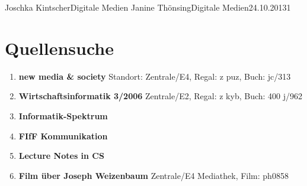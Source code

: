 \documentclass{lib/wa}
\begin{document}
  {Joschka Kintscher}{Digitale Medien}
  {Janine Thönsing}{Digitale Medien}{24.10.2013}{1}


\section{Quellensuche}

  \begin{enumerate}
    \item\textbf{new media \& society}
    \newline
    Standort: Zentrale/E4, Regal: z puz, Buch: jc/313
    \newline
    \cite{vergeer2013}

    \item\textbf{Wirtschaftsinformatik 3/2006}
    \newline
    Zentrale/E2, Regal: z kyb, Buch: 400 j/962
    \newline
    \cite{thiesse2006}

    \item\textbf{Informatik-Spektrum}
    \newline
    \cite{lintu2009}

    \item\textbf{FIfF Kommunikation}
    \newline
    \cite{bockerman2013}

    \item\textbf{Lecture Notes in CS}
    \newline
    \cite{temdee2006}

    \item\textbf{Film über Joseph Weizenbaum}
    \newline
    Zentrale/E4 Mediathek, Film: ph0858
    \newline
    \cite{haas2006}
    \newline
  \end{enumerate}

\end{document}
